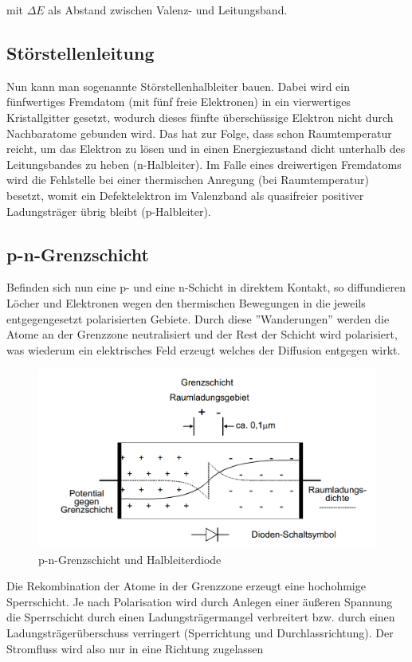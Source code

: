 \documentclass{article}
\begin{document}
mit \(\Delta E\) als Abstand zwischen Valenz- und Leitungsband.

\subsection{Störstellenleitung}
Nun kann man sogenannte Störstellenhalbleiter bauen. Dabei wird ein fünfwertiges Fremdatom (mit fünf freie Elektronen) in ein vierwertiges Kristallgitter gesetzt, wodurch dieses fünfte überschüssige Elektron nicht durch Nachbaratome gebunden wird. Das hat zur Folge, dass schon Raumtemperatur reicht, um das Elektron zu lösen und in einen Energiezustand dicht unterhalb des Leitungsbandes zu heben (n-Halbleiter). Im Falle eines dreiwertigen Fremdatoms wird die Fehlstelle bei einer thermischen Anregung (bei Raumtemperatur) besetzt, womit ein Defektelektron im Valenzband als quasifreier positiver Ladungsträger übrig bleibt (p-Halbleiter).

\subsection{p-n-Grenzschicht}
Befinden sich nun eine p- und eine n-Schicht in direktem Kontakt, so diffundieren Löcher und Elektronen wegen den thermischen Bewegungen in die jeweils entgegengesetzt polarisierten Gebiete. Durch diese ''Wanderungen'' werden die Atome an der Grenzzone neutralisiert und der Rest der Schicht wird polarisiert, was wiederum ein elektrisches Feld erzeugt welches der Diffusion entgegen wirkt.
\begin{figure}[H]
\includegraphics[width=\textwidth]{tra3}
\caption{p-n-Grenzschicht und Halbleiterdiode}
\end{figure}

Die Rekombination der Atome in der Grenzzone erzeugt eine hochohmige Sperrschicht. Je nach Polarisation wird durch Anlegen einer äußeren Spannung die Sperrschicht durch einen Ladungsträgermangel verbreitert bzw. durch einen Ladungsträgerüberschuss verringert (Sperrichtung und Durchlassrichtung). Der Stromfluss wird also nur in eine Richtung zugelassen
\end{document}
